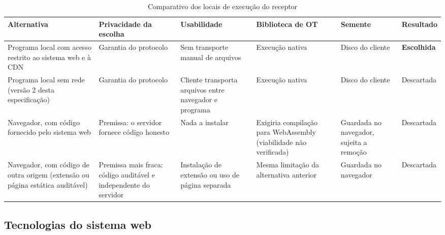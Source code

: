 \documentclass[12pt, oneside, a4paper, english, brazil]{abntex2}
\begin{document}
\begin{table}[H]
\centering
\caption{Comparativo dos locais de execução do receptor}\label{tab:comp-receptor}
\footnotesize
\renewcommand{\arraystretch}{1.25}
\begin{tabularx}{\textwidth}{@{}>{\raggedright\arraybackslash}p{}
  >{\raggedright\arraybackslash}X >{\raggedright\arraybackslash}X
  >{\raggedright\arraybackslash}X >{\raggedright\arraybackslash}X
  >{\raggedright\arraybackslash}p{}@{}}
\toprule
\textbf{Alternativa} & \textbf{Privacidade da escolha} & \textbf{Usabilidade} &
\textbf{Biblioteca de OT} & \textbf{Semente} & \textbf{Resultado} \\
\midrule
Programa local com acesso restrito ao sistema web e à CDN &
Garantia do protocolo &
Sem transporte manual de arquivos &
Execução nativa &
Disco do cliente &
\textbf{Escolhida} \\
\addlinespace
Programa local sem rede (versão 2 desta especificação) &
Garantia do protocolo &
Cliente transporta arquivos entre navegador e programa &
Execução nativa &
Disco do cliente &
Descartada \\
\addlinespace
Navegador, com código fornecido pelo sistema web &
Premissa: o servidor fornece código honesto &
Nada a instalar &
Exigiria compilação para WebAssembly (viabilidade não verificada) &
Guardada no navegador, sujeita a remoção &
Descartada \\
\addlinespace
Navegador, com código de outra origem (extensão ou página estática auditável) &
Premissa mais fraca: código auditável e independente do servidor &
Instalação de extensão ou uso de página separada &
Mesma limitação da alternativa anterior &
Guardada no navegador &
Descartada \\
\bottomrule
\end{tabularx}
\end{table}

\subsection{Tecnologias do sistema web}
\end{document}
